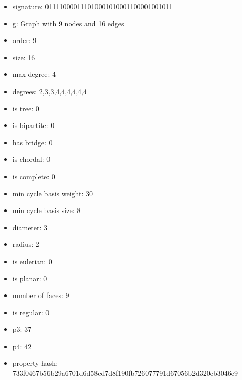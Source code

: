 \newpage
\begin{figure}
\end{figure}
\begin{itemize}
\item signature: 011110000111010001010001100001001011
\item g: Graph with 9 nodes and 16 edges
\item order: 9
\item size: 16
\item max degree: 4
\item degrees: 2,3,3,4,4,4,4,4,4
\item is tree: 0
\item is bipartite: 0
\item has bridge: 0
\item is chordal: 0
\item is complete: 0
\item min cycle basis weight: 30
\item min cycle basis size: 8
\item diameter: 3
\item radius: 2
\item is eulerian: 0
\item is planar: 0
\item number of faces: 9
\item is regular: 0
\item p3: 37
\item p4: 42
\item property hash: 733f0467b56b29a6701d6d58cd7d8f190fb726077791d67056b2d320eb3046e9
\end{itemize}
